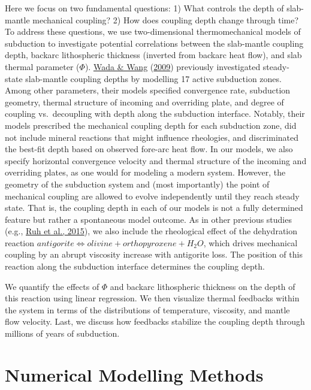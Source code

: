 \documentclass[draft,linenumbers]{agujournal2018}
\begin{document}
Here we focus on two fundamental questions: 1) What controls the depth
of slab-mantle mechanical coupling? 2) How does coupling depth change
through time? To address these questions, we use two-dimensional
thermomechanical models of subduction to investigate potential
correlations between the slab-mantle coupling depth, backarc
lithospheric thickness (inverted from backarc heat flow), and slab
thermal parameter (\(\Phi\)). \protect\hyperlink{ref-Wada2009}{Wada \&
Wang} (\protect\hyperlink{ref-Wada2009}{2009}) previously investigated
steady-state slab-mantle coupling depths by modelling 17 active
subduction zones. Among other parameters, their models specified
convergence rate, subduction geometry, thermal structure of incoming and
overriding plate, and degree of coupling vs.~decoupling with depth along
the subduction interface. Notably, their models prescribed the
mechanical coupling depth for each subduction zone, did not include
mineral reactions that might influence rheologies, and discriminated the
best-fit depth based on observed fore-arc heat flow. In our models, we
also specify horizontal convergence velocity and thermal structure of
the incoming and overriding plates, as one would for modeling a modern
system. However, the geometry of the subduction system and (most
importantly) the point of mechanical coupling are allowed to evolve
independently until they reach steady state. That is, the coupling depth
in each of our models is not a fully determined feature but rather a
spontaneous model outcome. As in other previous studies (e.g.,
\protect\hyperlink{ref-Ruh2015}{Ruh et al., 2015}), we also include the
rheological effect of the dehydration reaction
\(antigorite \allowbreak \Leftrightarrow olivine + orthopyroxene + H_{2}O\),
which drives mechanical coupling by an abrupt viscosity increase with
antigorite loss. The position of this reaction along the subduction
interface determines the coupling depth.

We quantify the effects of \(\Phi\) and backarc lithospheric thickness
on the depth of this reaction using linear regression. We then visualize
thermal feedbacks within the system in terms of the distributions of
temperature, viscosity, and mantle flow velocity. Last, we discuss how
feedbacks stabilize the coupling depth through millions of years of
subduction.

\hypertarget{numerical-modelling-methods}{%
\section{Numerical Modelling
Methods}\label{numerical-modelling-methods}}
\end{document}
